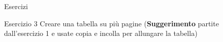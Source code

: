 \begin{frame}[fragile]{Esercizi}

\begin{block}{Esercizio 3}
	Creare una tabella su più pagine (\textbf{Suggerimento} partite
	dall'esercizio 1 e usate copia e incolla per allungare la tabella)
\end{block}

\end{frame}
